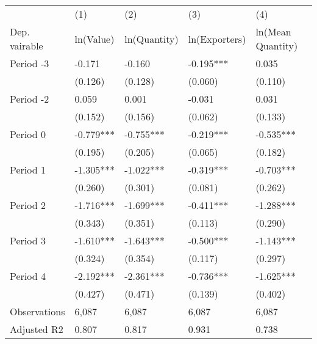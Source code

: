 \begin{tabular}{l*{5}{l}}
\hline
\hline
& (1) & (2) & (3) & (4)\\
Dep. vairable & ln(Value) & ln(Quantity) & ln(Exporters) & ln(Mean Quantity)\\
\hline
Period -3&-0.171&-0.160&-0.195***&0.035\\
&(0.126)&(0.128)&(0.060)&(0.110)\\
Period -2&0.059&0.001&-0.031&0.031\\
&(0.152)&(0.156)&(0.062)&(0.133)\\
Period 0&-0.779***&-0.755***&-0.219***&-0.535***\\
&(0.195)&(0.205)&(0.065)&(0.182)\\
Period 1&-1.305***&-1.022***&-0.319***&-0.703***\\
&(0.260)&(0.301)&(0.081)&(0.262)\\
Period 2&-1.716***&-1.699***&-0.411***&-1.288***\\
&(0.343)&(0.351)&(0.113)&(0.290)\\
Period 3&-1.610***&-1.643***&-0.500***&-1.143***\\
&(0.324)&(0.354)&(0.117)&(0.297)\\
Period 4&-2.192***&-2.361***&-0.736***&-1.625***\\
&(0.427)&(0.471)&(0.139)&(0.402)\\
Observations&6,087&6,087&6,087&6,087\\
Adjusted R2&0.807&0.817&0.931&0.738\\
\hline
\hline
\end{tabular}
